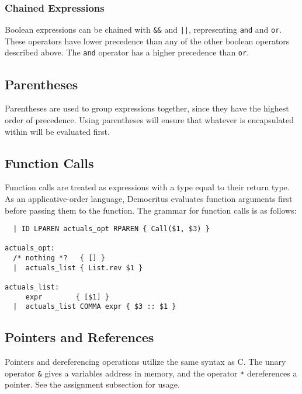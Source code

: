       \subsubsection{Chained Expressions}
            Boolean expressions can be chained with \verb|&&| and \verb!||!, representing \texttt{and} and \texttt{or}. These operators have lower precedence than any of the other boolean operators described above. The \texttt{and} operator has a higher precedence than \texttt{or}.

  \subsection{Parentheses}
    Parentheses are used to group expressions together, since they have the highest order of precedence. Using parentheses will ensure that whatever is encapsulated within will be evaluated first.

  \subsection{Function Calls}
    Function calls are treated as expressions with a type equal to their return type. As an applicative-order language, Democritus evaluates function arguments first before passing them to the function. The grammar for function calls is as follows:

    \begin{verbatim}
  | ID LPAREN actuals_opt RPAREN { Call($1, $3) }

actuals_opt:
  /* nothing *?   { [] }
  |  actuals_list { List.rev $1 }

actuals_list:
     expr        { [$1] }
  |  actuals_list COMMA expr { $3 :: $1 }
    \end{verbatim}


  \subsection{Pointers and References}
		Pointers and dereferencing operations utilize the same syntax as C. The unary operator \texttt{\&} gives a variables address in memory, and the operator \texttt{*} dereferences a pointer. See the assignment subsection for usage.
	
  \iffalse
	\subsection{Array access}
		Array access is done with \texttt{[\textit{i}]} where \textit{i} is the index being accessed. 
  \fi

